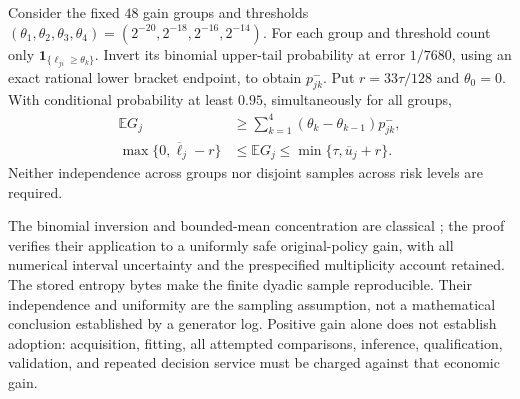 \begin{proposition}
\label{prop:population120}
Consider the fixed $48$ gain groups and thresholds
$(\theta_1,\theta_2,\theta_3,\theta_4)
=(2^{-20},2^{-18},2^{-16},2^{-14})$.
For each group and threshold count only
$\boldsymbol1_{\{\ell_{ji}\ge\theta_k\}}$.
Invert its binomial upper-tail probability at error $1/7680$,
using an exact rational lower bracket endpoint, to obtain
$p^-_{jk}$.  Put $r=33\tau/128$ and
$\theta_0=0$.  With conditional probability at least $0.95$,
simultaneously for all groups,
\begin{align}
 \mathbb E G_j
 &\ge \sum_{k=1}^4(\theta_k-\theta_{k-1})p^-_{jk},
 \label{eq:staircase120}\\
 \max\{0,\overline\ell_j-r\}
 &\le\mathbb E G_j
 \le\min\{\tau,\overline u_j+r\}.
 \label{eq:meangain120}
\end{align}
Neither independence across groups nor disjoint samples across risk
levels are required.
\end{proposition}

The binomial inversion and bounded-mean concentration are classical
\citep{clopperpearson1934,hoeffding1963}; the proof verifies their
application to a uniformly safe original-policy gain, with all numerical
interval uncertainty and the prespecified multiplicity account retained.
The stored entropy bytes make the finite dyadic sample reproducible.
Their independence and uniformity are the sampling assumption, not a
mathematical conclusion established by a generator log.
Positive gain alone does not establish adoption: acquisition, fitting,
all attempted comparisons, inference, qualification, validation, and
repeated decision service must be charged against that economic gain.
